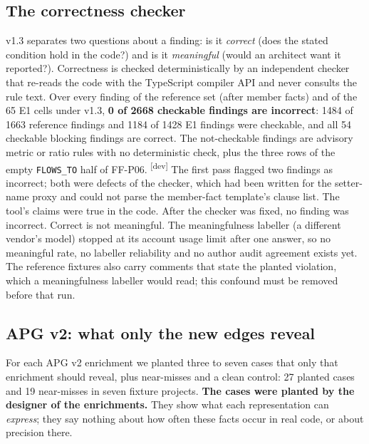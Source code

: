 \documentclass[10pt,a4paper]{article}
\newcommand{\devset}{\textsuperscript{\textsf{\tiny[dev]}}}
\newcommand{\edge}[1]{\texttt{\small #1}}
\begin{document}
\subsection{The correctness checker}\label{sec:v13-correct}

v1.3 separates two questions about a finding: is it \emph{correct} (does the stated condition hold in the code?) and
is it \emph{meaningful} (would an architect want it reported?). Correctness is checked deterministically by an
independent checker that re-reads the code with the TypeScript compiler API and never consults the rule text.
Over every finding of the reference set (after member facts) and of the 65 E1 cells under v1.3,
\textbf{0 of 2668 checkable findings are incorrect}: 1484 of 1663 reference findings and 1184 of 1428 E1 findings
were checkable, and all 54 checkable blocking findings are correct. The not-checkable findings are advisory metric
or ratio rules with no deterministic check, plus the three rows of the empty \edge{FLOWS\_TO} half of FF-P06. \devset{}
The first pass flagged two findings as incorrect; both were defects of the checker, which had been written for the
setter-name proxy and could not parse the member-fact template's clause list. The tool's claims were true in the
code. After the checker was fixed, no finding was incorrect. %
Correct is not meaningful. The meaningfulness labeller (a different vendor's model) stopped at its account usage
limit after one answer, so no meaningful rate, no labeller reliability and no author audit agreement exists yet. The
reference fixtures also carry comments that state the planted violation, which a meaningfulness labeller would read;
this confound must be removed before that run. %

\subsection{APG v2: what only the new edges reveal}\label{sec:v13-apg2}

For each APG v2 enrichment we planted three to seven cases that only that enrichment should reveal, plus
near-misses and a clean control: 27 planted cases and 19 near-misses in seven fixture projects. \textbf{The cases
were planted by the designer of the enrichments.} They show what each representation can \emph{express}; they say
nothing about how often these facts occur in real code, or about precision there. %
\end{document}
